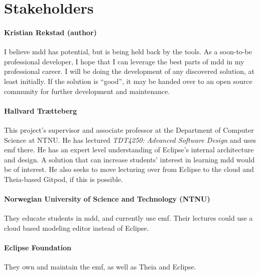 \section{Stakeholders}

\paragraph*{Kristian Rekstad (author)} I believe \acrfull{mdd} has potential, but is being held back by the tools. As a soon-to-be professional developer, I hope that I can leverage the best parts of \acrshort{mdd} in my professional career.
I will be doing the development of any discovered solution, at least initially.
If the solution is ``good'', it may be handed over to an \gls{open source} community for further development and maintenance.

\paragraph*{Hallvard Trætteberg} This project's supervisor and associate professor at the Department of Computer Science at \acrshort{NTNU}. 
He has lectured \textit{TDT4250: Advanced Software Design} and uses \acrshort{emf} there.
He has an expert level understanding of \gls{Eclipse}'s internal architecture and design.
A solution that can increase students' interest in learning \acrshort{mdd} would be of interest. 
He also seeks to move lecturing over from \gls{Eclipse} to the \gls{cloud} and \gls{Theia}-based \gls{Gitpod}, if this is possible.

\paragraph*{Norwegian University of Science and Technology (\acrshort{NTNU})} They educate students in \acrlong{mdd}, and currently use \acrshort{emf}. Their lectures could use a cloud based modeling editor instead of \gls{Eclipse}.

\paragraph*{Eclipse Foundation} They own and maintain the \acrlong{emf}, as well as \gls{Theia} and \gls{Eclipse}.

